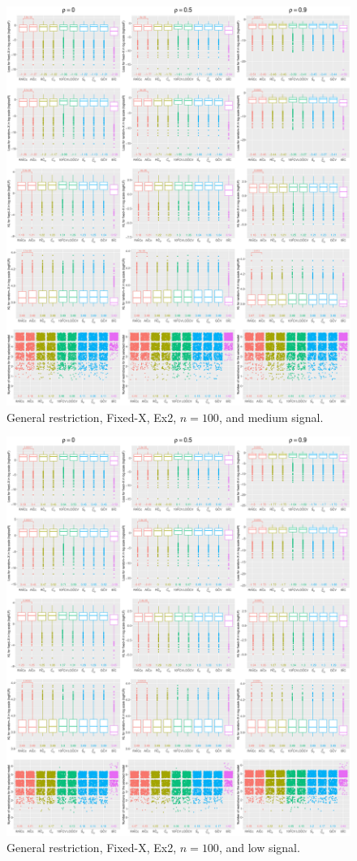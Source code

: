 \begin{figure}[!ht]
\centering
\includegraphics[width=\textwidth]{figures/supplement/fixedx/general_restriction/Ex2_n100_msnr.eps}
\caption{General restriction, Fixed-X, Ex2, $n=100$, and medium signal.}
\end{figure}
\clearpage
\begin{figure}[!ht]
\centering
\includegraphics[width=\textwidth]{figures/supplement/fixedx/general_restriction/Ex2_n100_lsnr.eps}
\caption{General restriction, Fixed-X, Ex2, $n=100$, and low signal.}
\end{figure}
